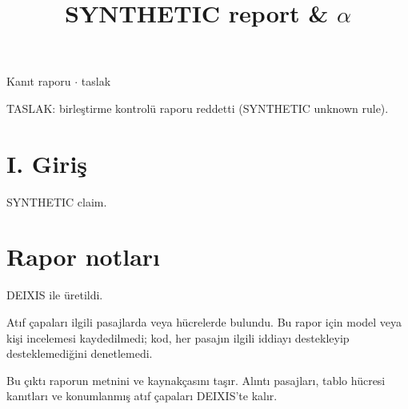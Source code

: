\documentclass[journal]{IEEEtran}
\begin{document}
\renewcommand{\abstractname}{Özet}
\renewcommand{\IEEEkeywordsname}{Dizin Terimleri}
\renewcommand{\refname}{Kaynaklar}

\title{SYNTHETIC report \& \ensuremath{\alpha}}

\maketitle

\noindent Kanıt raporu \ensuremath{\cdot} taslak

\noindent TASLAK: birleştirme kontrolü raporu reddetti (SYNTHETIC unknown rule).

\section*{I. Giriş}

SYNTHETIC claim. \cite{Synth26}

\section*{Rapor notları}

DEIXIS ile üretildi.

Atıf çapaları ilgili pasajlarda veya hücrelerde bulundu. Bu rapor için model veya kişi incelemesi kaydedilmedi; kod, her pasajın ilgili iddiayı destekleyip desteklemediğini denetlemedi.

Bu çıktı raporun metnini ve kaynakçasını taşır. Alıntı pasajları, tablo hücresi kanıtları ve konumlanmış atıf çapaları DEIXIS'te kalır.




\end{document}
